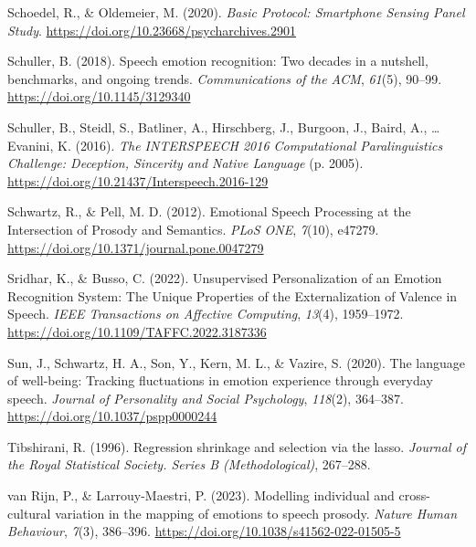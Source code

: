 \documentclass[
  english,
  man,floatsintext]{apa6}
\newlength{\cslhangindent}
\newenvironment{CSLReferences}[2] %
 {%
  \setlength{\parindent}{0pt}
  \ifodd #1 \everypar{\setlength{\hangindent}{\cslhangindent}}\ignorespaces\fi
  \ifnum #2 > 0
  \setlength{\parskip}{#2\baselineskip}
  \fi
 }%
 {}
\begin{document}
\begin{CSLReferences}{1}{0}
\leavevmode{}%
Schoedel, R., \& Oldemeier, M. (2020). \emph{Basic {Protocol}: {Smartphone Sensing Panel Study}}. \url{https://doi.org/10.23668/psycharchives.2901}

\leavevmode{}%
Schuller, B. (2018). Speech emotion recognition: Two decades in a nutshell, benchmarks, and ongoing trends. \emph{Communications of the ACM}, \emph{61}(5), 90--99. \url{https://doi.org/10.1145/3129340}

\leavevmode{}%
Schuller, B., Steidl, S., Batliner, A., Hirschberg, J., Burgoon, J., Baird, A., \ldots{} Evanini, K. (2016). \emph{The {INTERSPEECH} 2016 {Computational Paralinguistics Challenge}: {Deception}, {Sincerity} and {Native Language}} (p. 2005). \url{https://doi.org/10.21437/Interspeech.2016-129}

\leavevmode{}%
Schwartz, R., \& Pell, M. D. (2012). Emotional {Speech Processing} at the {Intersection} of {Prosody} and {Semantics}. \emph{PLoS ONE}, \emph{7}(10), e47279. \url{https://doi.org/10.1371/journal.pone.0047279}

\leavevmode{}%
Sridhar, K., \& Busso, C. (2022). Unsupervised {Personalization} of an {Emotion Recognition System}: {The Unique Properties} of the {Externalization} of {Valence} in {Speech}. \emph{IEEE Transactions on Affective Computing}, \emph{13}(4), 1959--1972. \url{https://doi.org/10.1109/TAFFC.2022.3187336}

\leavevmode{}%
Sun, J., Schwartz, H. A., Son, Y., Kern, M. L., \& Vazire, S. (2020). The language of well-being: {Tracking} fluctuations in emotion experience through everyday speech. \emph{Journal of Personality and Social Psychology}, \emph{118}(2), 364--387. \url{https://doi.org/10.1037/pspp0000244}

\leavevmode{}%
Tibshirani, R. (1996). Regression shrinkage and selection via the lasso. \emph{Journal of the Royal Statistical Society. Series B (Methodological)}, 267--288.

\leavevmode{}%
van Rijn, P., \& Larrouy-Maestri, P. (2023). Modelling individual and cross-cultural variation in the mapping of emotions to speech prosody. \emph{Nature Human Behaviour}, \emph{7}(3), 386--396. \url{https://doi.org/10.1038/s41562-022-01505-5}


\end{CSLReferences}
\end{document}
